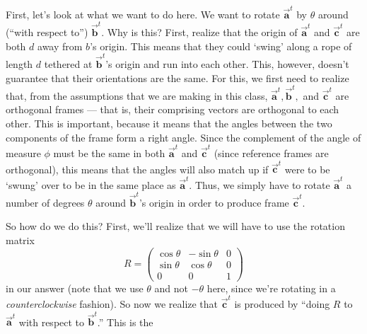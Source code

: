 \documentclass[11pt]{tingpset}
\begin{document}
    \renewcommand{\a}{\vec{\boldsymbol{a}}^t}
    \renewcommand{\b}{\vec{\boldsymbol{b}}^t}
    \renewcommand{\c}{\vec{\boldsymbol{c}}^t}
    First, let's look at what we want to do here. We want to rotate $\a$ by $\theta$ around (``with respect to'') $\b$. Why is this? First, realize that the origin of $\a$ and $\c$ are both $d$ away from $b$'s origin. This means that they could `swing' along a rope of length $d$ tethered at $\b$'s origin and run into each other. This, however, doesn't guarantee that their orientations are the same. For this, we first need to realize that, from the assumptions that we are making in this class, $\a, \b,$ and $\c$ are orthogonal frames --- that is, their comprising vectors are orthogonal to each other. This is important, because it means that the angles between the two components of the frame form a right angle. Since the complement of the angle of measure $\phi$ must be the same in both $\a$ and $\c$ (since reference frames are orthogonal), this means that the angles will also match up if $\c$ were to be `swung' over to be in the same place as $\a$. Thus, we simply have to rotate $\a$ a number of degrees $\theta$ around $\b$'s origin in order to produce frame $\c$.

    So how do we do this? First, we'll realize that we will have to use the rotation matrix
    \[
      R=
        \begin{pmatrix}
          \cos{\theta} & -\sin{\theta} & 0 \\
          \sin{\theta} & \cos{\theta} & 0 \\
          0 & 0 & 1
       \end{pmatrix}
    \]
    in our answer (note that we use $\theta$ and not $-\theta$ here, since we're rotating in a \emph{counterclockwise} fashion). So now we realize that $\c$ is produced by ``doing $R$ to $\a$ with respect to $\b$.'' This is the
\end{document}
